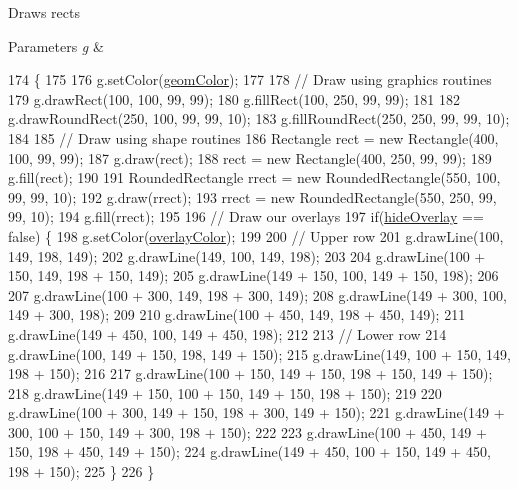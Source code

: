 Draws rects 
\begin{DoxyParams}{Parameters}
{\em g} & \\
\hline
\end{DoxyParams}

\begin{DoxyCode}
174                               \{
175 
176         g.setColor(\mbox{\hyperlink{classorg_1_1newdawn_1_1slick_1_1tests_1_1_geom_accuracy_test_a9e3a8cc2f12479af231295fcd97a47cc}{geomColor}});
177         
178         \textcolor{comment}{// Draw using graphics routines}
179         g.drawRect(100, 100, 99, 99);
180         g.fillRect(100, 250, 99, 99);
181         
182         g.drawRoundRect(250, 100, 99, 99, 10);
183         g.fillRoundRect(250, 250, 99, 99, 10);
184         
185         \textcolor{comment}{// Draw using shape routines}
186         Rectangle rect = \textcolor{keyword}{new} Rectangle(400, 100, 99, 99);
187         g.draw(rect);
188         rect = \textcolor{keyword}{new} Rectangle(400, 250, 99, 99);
189         g.fill(rect);
190         
191         RoundedRectangle rrect = \textcolor{keyword}{new} RoundedRectangle(550, 100, 99, 99, 10);
192         g.draw(rrect);
193         rrect = \textcolor{keyword}{new} RoundedRectangle(550, 250, 99, 99, 10);
194         g.fill(rrect);
195         
196         \textcolor{comment}{// Draw our overlays}
197         \textcolor{keywordflow}{if}(\mbox{\hyperlink{classorg_1_1newdawn_1_1slick_1_1tests_1_1_geom_accuracy_test_a8bf56aed165a599089d1f85d30422e8a}{hideOverlay}} == \textcolor{keyword}{false}) \{
198             g.setColor(\mbox{\hyperlink{classorg_1_1newdawn_1_1slick_1_1tests_1_1_geom_accuracy_test_aff160497b9c7289f4a9a7f17dbcdcdf2}{overlayColor}});
199             
200             \textcolor{comment}{// Upper row}
201             g.drawLine(100, 149, 198, 149);
202             g.drawLine(149, 100, 149, 198);
203             
204             g.drawLine(100 + 150, 149, 198 + 150, 149);
205             g.drawLine(149 + 150, 100, 149 + 150, 198);
206     
207             g.drawLine(100 + 300, 149, 198 + 300, 149);
208             g.drawLine(149 + 300, 100, 149 + 300, 198);
209             
210             g.drawLine(100 + 450, 149, 198 + 450, 149);
211             g.drawLine(149 + 450, 100, 149 + 450, 198);
212             
213             \textcolor{comment}{// Lower row}
214             g.drawLine(100, 149 + 150, 198, 149 + 150);
215             g.drawLine(149, 100 + 150, 149, 198 + 150);
216             
217             g.drawLine(100 + 150, 149 + 150, 198 + 150, 149 + 150);
218             g.drawLine(149 + 150, 100 + 150, 149 + 150, 198 + 150);
219     
220             g.drawLine(100 + 300, 149 + 150, 198 + 300, 149 + 150);
221             g.drawLine(149 + 300, 100 + 150, 149 + 300, 198 + 150);
222             
223             g.drawLine(100 + 450, 149 + 150, 198 + 450, 149 + 150);
224             g.drawLine(149 + 450, 100 + 150, 149 + 450, 198 + 150);
225         \}       
226     \}
\end{DoxyCode}
